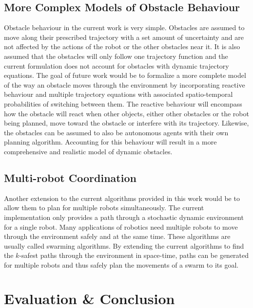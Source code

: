 \subsection{More Complex Models of Obstacle Behaviour}

Obstacle behaviour in the current work is very simple. Obstacles are assumed to
move along their prescribed trajectory with a set amount of uncertainty and are
not affected by the actions of the robot or the other obstacles near it. It is
also assumed that the obstacles will only follow one trajectory function and
the current formulation does not account for obstacles with dynamic trajectory
equations. The goal of future work would be to formalize a more complete model
of the way an obstacle moves through the environment by incorporating reactive
behaviour and multiple trajectory equations with associated spatio-temporal
probabilities of switching between them. The reactive behaviour will encompass
how the obstacle will react when other objects, either other obstacles or the
robot being planned, move toward the obstacle or interfere with its trajectory.
Likewise, the obstacles can be assumed to also be autonomous agents with their
own planning algorithm. Accounting for this behaviour will result in a more
comprehensive and realistic model of dynamic obstacles.

\subsection{Multi-robot Coordination}

Another extension to the current algorithms provided in this work would be to
allow them to plan for multiple robots simultaneously. The current
implementation only provides a path through a stochastic dynamic environment
for a single robot. Many applications of robotics need multiple robots to move
through the environment safely and at the same time. These algorithms are
usually called swarming algorithms. By extending the current algorithms to find
the $k$-safest paths through the environment in space-time, paths can be
generated for multiple robots and thus safely plan the movements of a swarm to
its goal.

\section{Evaluation \& Conclusion}

